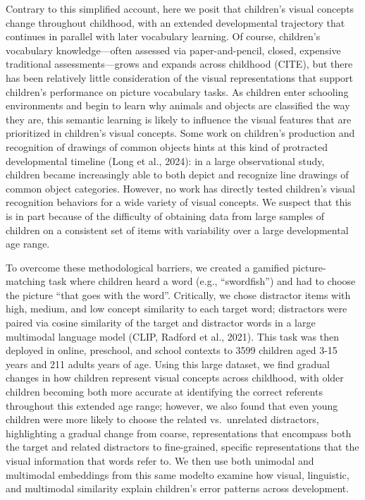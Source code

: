 \documentclass[
  man]{apa6}
\begin{document}
Contrary to this simplified account, here we posit that children's visual concepts change throughout childhood, with an extended developmental trajectory that continues in parallel with later vocabulary learning. Of course, children's vocabulary knowledge---often assessed via paper-and-pencil, closed, expensive traditional assessments---grows and expands across childhood (CITE), but there has been relatively little consideration of the visual representations that support children's performance on picture vocabulary tasks. As children enter schooling environments and begin to learn why animals and objects are classified the way they are, this semantic learning is likely to influence the visual features that are prioritized in children's visual concepts. Some work on children's production and recognition of drawings of common objects hints at this kind of protracted developmental timeline (Long et al., 2024): in a large observational study, children became increasingly able to both depict and recognize line drawings of common object categories. However, no work has directly tested children's visual recognition behaviors for a wide variety of visual concepts. We suspect that this is in part because of the difficulty of obtaining data from large samples of children on a consistent set of items with variability over a large developmental age range.

To overcome these methodological barriers, we created a gamified picture-matching task where children heard a word (e.g., ``swordfish'') and had to choose the picture ``that goes with the word''. Critically, we chose distractor items with high, medium, and low concept similarity to each target word; distractors were paired via cosine similarity of the target and distractor words in a large multimodal language model (CLIP, Radford et al., 2021). This task was then deployed in online, preschool, and school contexts to 3599 children aged 3-15 years and 211 adults years of age. Using this large dataset, we find gradual changes in how children represent visual concepts across childhood, with older children becoming both more accurate at identifying the correct referents throughout this extended age range; however, we also found that even young children were more likely to choose the related vs.~unrelated distractors, highlighting a gradual change from coarse, representations that encompass both the target and related distractors to fine-grained, specific representations that the visual information that words refer to. We then use both unimodal and multimodal embeddings from this same modelto examine how visual, linguistic, and multimodal similarity explain children's error patterns across development.
\end{document}
